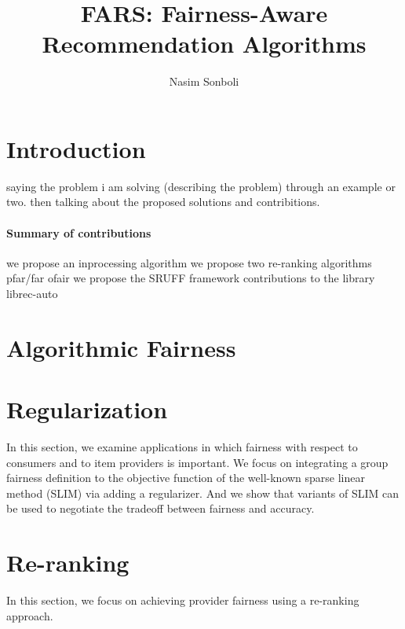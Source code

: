\documentclass[manuscript,screen,review]{acmart}
\title{FARS: Fairness-Aware Recommendation Algorithms}
\author{Nasim Sonboli}
\begin{document}
\maketitle

\section{Introduction}
saying the problem i am solving (describing the problem) through an example or two. then talking about the proposed solutions and contribitions.
\paragraph{\textbf{Summary of contributions}}

we propose an inprocessing algorithm
we propose two re-ranking algorithms
pfar/far
ofair
we propose the SRUFF framework
contributions to the library librec-auto

\section{Algorithmic Fairness}

% 


\section{Regularization}
In this section, we examine applications in which fairness with respect to consumers and to item providers is important. We focus on integrating a group fairness definition to the objective function of the well-known sparse linear method (SLIM) via adding a regularizer. And we show that variants of SLIM can be used to negotiate the tradeoff between fairness and accuracy.
% 

\section{Re-ranking}

In this section, we focus on achieving provider fairness using a re-ranking approach.
\end{document}
